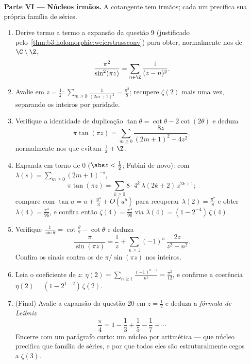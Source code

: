 \begin{problem}
\medskip
\noindent\textbf{Parte VI --- Núcleos irmãos.} A cotangente tem irmãos;
cada um precifica sua própria família de séries.
\begin{enumerate}[resume]
  \item Derive termo a termo a expansão da questão 9 (justificado
        pelo~\cref{thm:b3:holomorphic:weierstrassconv}) para obter, normalmente nos  de
        $\C\setminus\Z$,
        \[
        \frac{\pi^2}{\sin^2(\pi z)} =
        \sum_{n\in\Z}\frac1{(z - n)^2} .
        \]
  \item Avalie em $z = \frac12$: $\sum_{m\geq0}\frac1{(2m+1)^2} = \frac{\pi^2}8$; recupere $\zeta(2)$ mais uma vez, separando os
        inteiros por paridade.
  \item Verifique a identidade de duplicação $\tan\theta =
        \cot\theta - 2\cot(2\theta)$ e deduza
        \[
        \pi\tan(\pi z) =
        \sum_{m\geq0}\frac{8z}{(2m+1)^2 - 4z^2} ,
        \]
        normalmente nos  que evitam $\frac12 + \Z$.
  \item Expanda em torno de $0$ ($\abs z < \frac12$; Fubini de novo): com $\lambda(s) =
        \sum_{m\geq0}(2m+1)^{-s}$,
        \[
        \pi\tan(\pi z) =
        \sum_{k\geq0}8\cdot4^k\,\lambda(2k+2)\,z^{2k+1} ;
        \]
        compare com $\tan u = u + \frac{u^3}3 + O(u^5)$ para recuperar $\lambda(2) = \frac{\pi^2}8$ e obter $\lambda(4) = \frac{\pi^4}{96}$, e confira
        então $\zeta(4) = \frac{\pi^4}{90}$ via $\lambda(4) = (1 -
        2^{-4})\,\zeta(4)$.
  \item Verifique $\frac1{\sin\theta} = \cot\frac\theta2 -
        \cot\theta$ e deduza
        \[
        \frac{\pi}{\sin(\pi z)} = \frac1z +
        \sum_{n\geq1}(-1)^n\,\frac{2z}{z^2 - n^2} .
        \]
        Confira os sinais contra os  de $\pi/\sin(\pi z)$ nos inteiros.
  \item Leia o coeficiente de $z$: $\eta(2) =
        \sum_{n\geq1}\frac{(-1)^{n-1}}{n^2} =
        \frac{\pi^2}{12}$, e confirme a coerência
        $\eta(2) = (1 - 2^{1-2})\,\zeta(2)$.
  \item (Final) Avalie a expansão da questão 20 em $z =
        \frac12$ e deduza a
        \emph{fórmula de Leibniz}
        \[
        \frac\pi4 = 1 - \frac13 + \frac15 - \frac17 +
        \cdots
        \]
        Encerre com um parágrafo curto: um núcleo por aritmética ---
        que núcleo precifica que família de séries, e por que todos eles
        são estruturalmente cegos a $\zeta(3)$.


\end{enumerate}
\end{problem}
